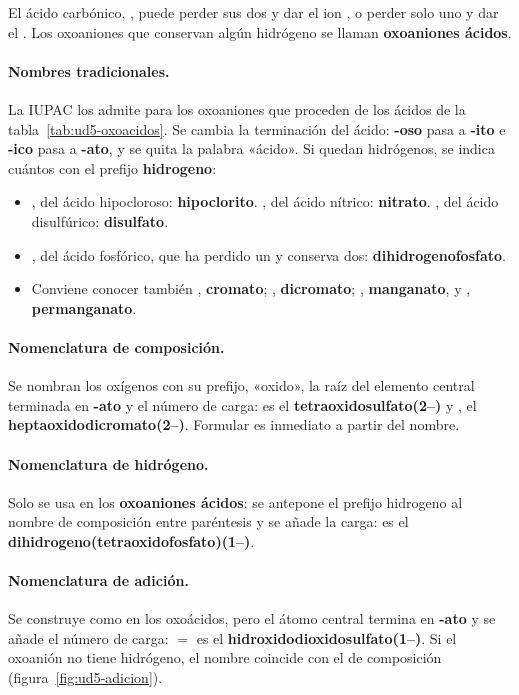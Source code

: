 El ácido carbónico, , puede perder sus dos  y dar el ion , o perder solo uno y dar el
. Los oxoaniones que conservan algún hidrógeno se llaman \textbf{oxoaniones ácidos}.

\paragraph{Nombres tradicionales.} La IUPAC los admite para los oxoaniones que proceden de los ácidos de la
tabla~\ref{tab:ud5-oxoacidos}. Se cambia la terminación del ácido: \textbf{-oso} pasa a \textbf{-ito} e \textbf{-ico} pasa a
\textbf{-ato}, y se quita la palabra «ácido». Si quedan hidrógenos, se indica cuántos con el prefijo \textbf{hidrogeno}:
\begin{itemize}
    \item {}, del ácido hipocloroso: \textbf{hipoclorito}. , del ácido nítrico: \textbf{nitrato}.
    , del ácido disulfúrico: \textbf{disulfato}.
    \item {}, del ácido fosfórico, que ha perdido un  y conserva dos: \textbf{dihidrogenofosfato}.
    \item Conviene conocer también , \textbf{cromato}; , \textbf{dicromato}; ,
    \textbf{manganato}, y , \textbf{permanganato}.
\end{itemize}

\paragraph{Nomenclatura de composición.} Se nombran los oxígenos con su prefijo, «oxido», la raíz del elemento central
terminada en \textbf{-ato} y el número de carga:  es el \textbf{tetraoxidosulfato(2\nobreakdash--)} y , el
\textbf{heptaoxidodicromato(2\nobreakdash--)}. Formular es inmediato a partir del nombre.

\paragraph{Nomenclatura de hidrógeno.} Solo se usa en los \textbf{oxoaniones ácidos}: se antepone el prefijo hidrogeno al nombre
de composición entre paréntesis y se añade la carga:  es el \textbf{dihidrogeno(tetraoxidofosfato)(1\nobreakdash--)}.

\paragraph{Nomenclatura de adición.} Se construye como en los oxoácidos, pero el átomo central termina en \textbf{-ato} y se
añade el número de carga:  \(=\)  es el \textbf{hidroxidodioxidosulfato(1\nobreakdash--)}. Si el oxoanión no tiene
hidrógeno, el nombre coincide con el de composición (figura~\ref{fig:ud5-adicion}).

